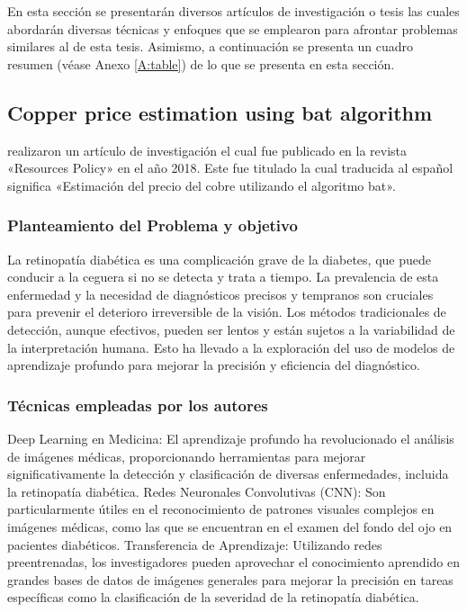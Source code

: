En esta sección se presentarán diversos artículos de investigación o tesis las cuales abordarán diversas técnicas y enfoques que se emplearon para afrontar problemas similares al de esta tesis. Asimismo, a continuación se presenta un cuadro resumen (véase Anexo \ref{A:table}) de lo que se presenta en esta sección.


\subsection{Copper price estimation using bat algorithm \citep*{pr_dehghani2018copper}}
\citeauthor{pr_dehghani2018copper} realizaron un artículo de investigación el cual fue publicado en la revista «Resources Policy» en el año 2018. Este fue titulado  la cual traducida al español significa «Estimación del precio del cobre utilizando el algoritmo bat».

\subsubsection{Planteamiento del Problema y objetivo }

La retinopatía diabética es una complicación grave de la diabetes, que puede conducir a la ceguera si no se detecta y trata a tiempo. La prevalencia de esta enfermedad y la necesidad de diagnósticos precisos y tempranos son cruciales para prevenir el deterioro irreversible de la visión. Los métodos tradicionales de detección, aunque efectivos, pueden ser lentos y están sujetos a la variabilidad de la interpretación humana. Esto ha llevado a la exploración del uso de modelos de aprendizaje profundo para mejorar la precisión y eficiencia del diagnóstico.

\subsubsection{Técnicas empleadas por los autores}

Deep Learning en Medicina: El aprendizaje profundo ha revolucionado el análisis de imágenes médicas, proporcionando herramientas para mejorar significativamente la detección y clasificación de diversas enfermedades, incluida la retinopatía diabética.
Redes Neuronales Convolutivas (CNN): Son particularmente útiles en el reconocimiento de patrones visuales complejos en imágenes médicas, como las que se encuentran en el examen del fondo del ojo en pacientes diabéticos.
Transferencia de Aprendizaje: Utilizando redes preentrenadas, los investigadores pueden aprovechar el conocimiento aprendido en grandes bases de datos de imágenes generales para mejorar la precisión en tareas específicas como la clasificación de la severidad de la retinopatía diabética.

